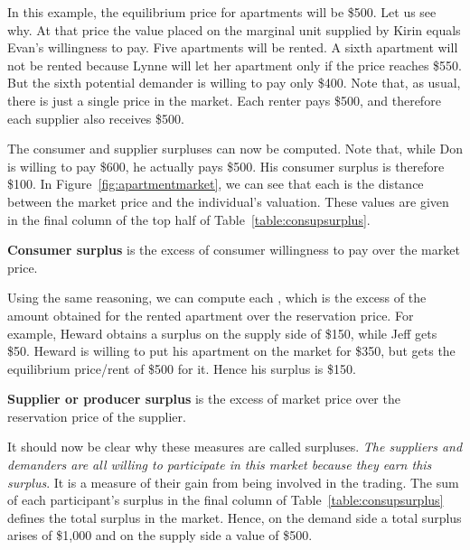 \newhtmlpage




In this example, the equilibrium price for apartments will be \$500. Let us
see why. At that price the value placed on the marginal unit supplied by
Kirin equals Evan's willingness to pay. Five apartments will be rented. A
sixth apartment will not be rented because Lynne will let her apartment only
if the price reaches \$550. But the sixth potential demander is willing to
pay only \$400. Note that, as usual, there is just a single price in the
market. Each renter pays \$500, and therefore each supplier also receives
\$500.

The consumer and supplier surpluses can now be computed. Note that, while
Don is willing to pay \$600, he actually pays \$500. His consumer surplus is
therefore \$100. In Figure~\ref{fig:apartmentmarket}, we can see that each %
 is the distance between the market price
and the individual's valuation. These values are given in the final column
of the top half of Table~\ref{table:consupsurplus}.

\begin{DefBox}
\textbf{Consumer surplus} is the excess of consumer willingness to pay over the market price.
\end{DefBox}

Using the same reasoning, we can compute each , which is the excess of the amount obtained for the rented
apartment over the reservation price. For example, Heward obtains a surplus
on the supply side of \$150, while Jeff gets \$50. Heward is willing to put
his apartment on the market for \$350, but gets the equilibrium price/rent
of \$500 for it. Hence his surplus is \$150.

\begin{DefBox}
\textbf{Supplier or producer surplus} is the excess of market price over the reservation price of the supplier.
\end{DefBox}

It should now be clear why these measures are called surpluses. \textit{The
suppliers and demanders are all willing to participate in this market
because they earn this surplus}. It is a measure of their gain from being
involved in the trading. The sum of each participant's surplus in the final
column of Table~\ref{table:consupsurplus} defines the total surplus in the
market. Hence, on the demand side a total surplus arises of \$1,000 and on
the supply side a value of \$500.

